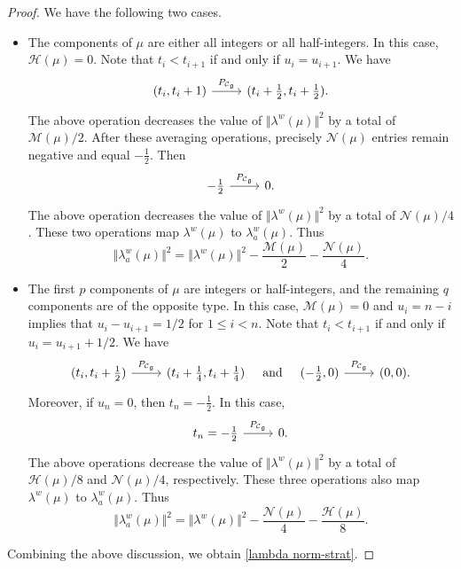 \documentclass[11pt]{amsart}
\theoremstyle{plain}
\theoremstyle{definition}
\newcommand{\mfg}{\mathfrak{g}}
\newcommand{\C}{\mathcal{C}}
\newcommand{\caH}{\mathcal{H}}
\newcommand{\M}{\mathcal{M}}
\newcommand{\caN}{\mathcal{N}}
\newcommand{\N}{\mathcal{N}}
\begin{document}
\begin{proof}
We have the following two cases.
	\begin{itemize}
		\item[$\bullet$] The components of $\mu$ are either all integers or all half-integers. In this case,  $\mathcal{H}(\mu)=0$. Note that $t_i<t_{i+1}$ if and only if $u_i=u_{i+1}$. We have
		\[\begin{tikzcd}(t_i,t_i+1)\arrow[r,"P_{\C_\mfg}"]& (t_i+\frac{1}{2},t_i+\frac{1}{2}).\end{tikzcd}\]
		The above operation decreases the value of $\Vert \lambda^w(\mu)\Vert^2$ by a total of $\M(\mu)/2$. After these averaging operations, precisely $\caN(\mu)$ entries remain negative and equal $-\frac{1}{2}$.  Then
		\[\begin{tikzcd}-\frac{1}{2}\arrow[r,"P_{\C_\mfg}"]& 0.\end{tikzcd}\]
		The above operation decreases the value of $\Vert \lambda^w(\mu)\Vert^2$ by a total of $\N(\mu)/4$. These two operations map $\lambda^w(\mu)$ to $\lambda_a^w(\mu)$. Thus
		\[\Vert \lambda_a^w(\mu)\Vert^2=\Vert \lambda^w(\mu)\Vert^2-\frac{\M(\mu)}{2}-\frac{\N(\mu)}{4}.\]
		\item[$\bullet$] The first $p$ components of $\mu$ are integers or half-integers, and the remaining $q$ components are of the opposite type. In this case, $\M(\mu)=0$ and $u_i=n-i$ implies that $u_i-u_{i+1}=1/2$ for $1\le i<n$. Note that $t_i<t_{i+1}$ if and only if $u_i=u_{i+1}+1/2$. We have
		\[\begin{tikzcd}(t_i,t_i+\frac{1}{2})\arrow[r,"P_{\C_\mfg}"]& (t_i+\frac{1}{4},t_i+\frac{1}{4})\end{tikzcd}\quad \mbox{and}\quad \begin{tikzcd}(-\frac{1}{2},0)\arrow[r,"P_{\C_\mfg}"]& (0,0).\end{tikzcd}\]
		Moreover, if $u_n=0$, then $t_n=-\frac{1}{2}$. In this case,
		\[\begin{tikzcd}t_n=-\frac{1}{2}\arrow[r,"P_{\C_\mfg}"]& 0.\end{tikzcd}\]
		The above operations decrease the value of $\Vert \lambda^w(\mu)\Vert^2$ by a total of $\caH(\mu)/8$ and $\N(\mu)/4$, respectively. These three operations also map $\lambda^w(\mu)$ to $\lambda_a^w(\mu)$. Thus
		\[\Vert\lambda_a^w(\mu)\Vert^2=\Vert \lambda^w(\mu)\Vert^2-\frac{\N(\mu)}{4}-\frac{\caH(\mu)}{8}.\]
	\end{itemize}
	Combining the above discussion, we obtain \eqref{lambda norm-strat}.
\end{proof}
\end{document}
